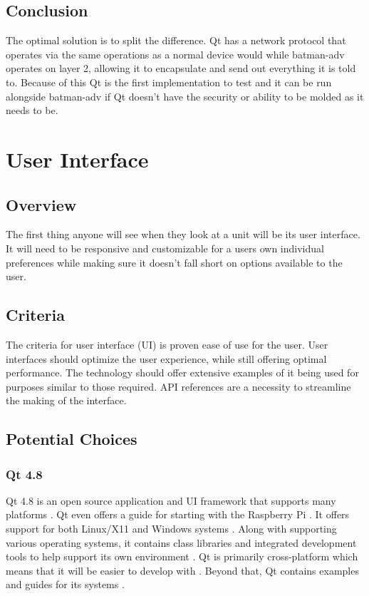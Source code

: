 \documentclass[onecolumn, draftclsnofoot,10pt, compsoc]{IEEEtran}
\begin{document}
\subsection{Conclusion}

The optimal solution is to split the difference. Qt has a network protocol that operates via the same operations as a normal device would while batman-adv operates on layer 2, allowing it to encapsulate and send out everything it is told to. Because of this Qt is the first implementation to test and it can be run alongside batman-adv if Qt doesn't have the security or ability to be molded as it needs to be.


\section{User Interface}

\subsection{Overview}

The first thing anyone will see when they look at a unit will be its user interface. It will need to be responsive and customizable for a users own individual preferences while making sure it doesn't fall short on options available to the user.

\subsection{Criteria}

The criteria for user interface (UI) is proven ease of use for the user. User interfaces should optimize the user experience, while still offering optimal performance. The technology should offer extensive examples of it being used for purposes similar to those required. API references are a necessity to streamline the making of the interface.

\subsection{Potential Choices}

\subsubsection{Qt 4.8}

Qt 4.8 is an open source application and UI framework that supports many platforms \cite{QT:open} \cite{QT:platforms}. Qt even offers a guide for starting with the Raspberry Pi \cite{QT:pi}. It offers support for both Linux/X11 and Windows systems \cite{QT:linux} \cite{QT:windows}. Along with supporting various operating systems, it contains class libraries and integrated development tools to help support its own environment \cite{QT:linux} \cite{QT:windows}. Qt is primarily cross-platform which means that it will be easier to develop with \cite{QT:platforms}. Beyond that, Qt contains examples and guides for its systems \cite{QT:learn}.
\end{document}
